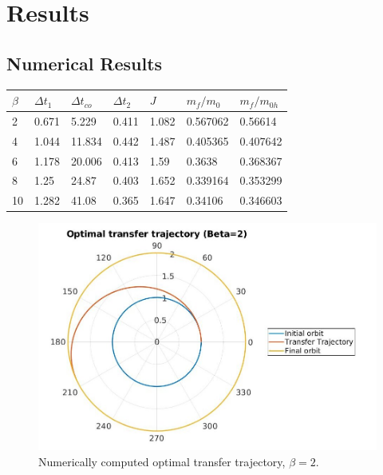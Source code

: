 \chapter{Results}
\section{Numerical Results}

\begin{table}[H]
  \centering
  \begin{tabular}{@{}lllllll@{}}
  \toprule
  $\beta$ & $\Delta t_1$ & $\Delta t_{co}$ & $\Delta t_2$ & $J$ & $m_f/m_0$ & $m_f/m_{0h}$ \\ \midrule
  2 & 0.671 & 5.229 & 0.411 & 1.082 & 0.567062 & 0.56614 \\
  4 & 1.044 & 11.834 & 0.442 & 1.487 & 0.405365 & 0.407642 \\
  6 & 1.178 & 20.006 & 0.413 & 1.59 & 0.3638 & 0.368367 \\
  8 & 1.25 & 24.87 & 0.403 & 1.652 & 0.339164 & 0.353299 \\
  10 & 1.282 & 41.08 & 0.365 & 1.647 & 0.34106 & 0.346603 \\ \bottomrule
  \end{tabular}
  \label{tab:Numerical_Results}
  \end{table}

\begin{figure}[H]
    \includegraphics[width=\linewidth]{./jpgs/thrustArcB2.jpg}
    \caption{Numerically computed optimal transfer trajectory, $\beta = 2$.}
    \label{fig:Tarc-B2}
  \end{figure}


